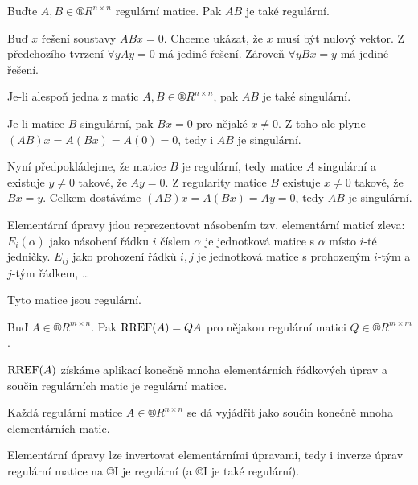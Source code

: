 \documentclass[12pt]{article}					%
\begin{document}
    \begin{tvrzeni}
        Buďte $A, B \in ®R^{n\times n}$ regulární matice. Pak $AB$ je také regulární.
        \begin{dukazin}
            Buď $x$ řešení soustavy $ABx = 0$. Chceme ukázat, že $x$ musí být nulový vektor. Z předchozího tvrzení $\forall y Ay=0$ má jediné řešení. Zároveň $\forall y Bx = y$ má jediné řešení.
        \end{dukazin}
    \end{tvrzeni}

    \begin{tvrzeni}
        Je-li alespoň jedna z matic $A, B \in ®R^{n \times n}$, pak $AB$ je také singulární.

        \begin{dukazin}
            Je-li matice $B$ singulární, pak $Bx = 0$ pro nějaké $x ≠ 0$. Z toho ale plyne $(AB)x = A(Bx) = A(0)=0$, tedy i $AB$ je singulární.

            Nyní předpokládejme, že matice $B$ je regulární, tedy matice $A$ singulární a existuje $y≠0$ takové, že $Ay = 0$. Z regularity matice $B$ existuje $x≠0$ takové, že $Bx=y$. Celkem dostáváme $(AB)x = A(Bx) = Ay = 0$, tedy $AB$ je singulární.
        \end{dukazin}
    \end{tvrzeni}

    \begin{definice}
        Elementární úpravy jdou reprezentovat násobením tzv. elementární maticí zleva: $E_i(\alpha)$ jako násobení řádku $i$ číslem $\alpha$ je jednotková matice s $\alpha$ místo $i$-té jedničky. $E_{ij}$ jako prohození řádků $i, j$ je jednotková matice s prohozeným $i$-tým a $j$-tým řádkem, …

        Tyto matice jsou regulární.
    \end{definice}

    \begin{veta}
        Buď $A \in ®R^{m\times n}$. Pak $\operatorname{RREF}(A) = QA$ pro nějakou regulární matici $Q \in ®R^{m \times m}$.
        \begin{dukazin}
            $\operatorname{RREF}(A)$ získáme aplikací konečně mnoha elementárních řádkových úprav a součin regulárních matic je regulární matice.
        \end{dukazin}
    \end{veta}

    \begin{tvrzeni}
        Každá regulární matice $A \in ®R^{n\times n}$ se dá vyjádřit jako součin konečně mnoha elementárních matic.
        \begin{dukazin}
            Elementární úpravy lze invertovat elementárními úpravami, tedy i inverze úprav regulární matice na ©I je regulární (a ©I je také regulární).
        \end{dukazin}
    \end{tvrzeni}
\end{document}

